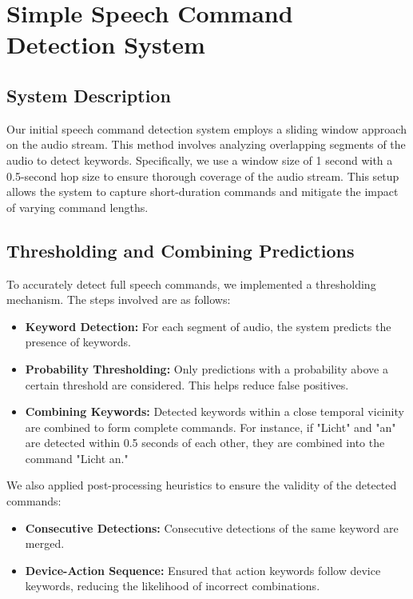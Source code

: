 \section{Simple Speech Command Detection System}
\subsection{System Description}
Our initial speech command detection system employs a sliding window approach on the audio stream. This method involves analyzing overlapping segments of the audio to detect keywords. Specifically, we use a window size of 1 second with a 0.5-second hop size to ensure thorough coverage of the audio stream. This setup allows the system to capture short-duration commands and mitigate the impact of varying command lengths.

\subsection{Thresholding and Combining Predictions}
To accurately detect full speech commands, we implemented a thresholding mechanism. The steps involved are as follows:

\begin{itemize}
  \item \textbf{Keyword Detection:} For each segment of audio, the system predicts the presence of keywords.
  \item \textbf{Probability Thresholding:} Only predictions with a probability above a certain threshold are considered. This helps reduce false positives.
  \item \textbf{Combining Keywords:} Detected keywords within a close temporal vicinity are combined to form complete commands. For instance, if "Licht" and "an" are detected within 0.5 seconds of each other, they are combined into the command "Licht an."
\end{itemize}
We also applied post-processing heuristics to ensure the validity of the detected commands:
\begin{itemize}
  \item \textbf{Consecutive Detections:} Consecutive detections of the same keyword are merged.
  \item \textbf{Device-Action Sequence:} Ensured that action keywords follow device keywords, reducing the likelihood of incorrect combinations.

\end{itemize}

